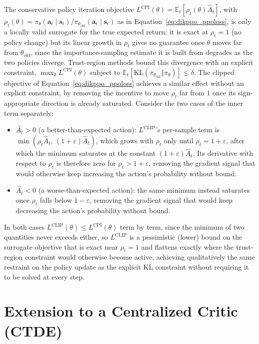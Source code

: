 The conservative policy iteration objective $L^{\text{CPI}}(\theta) = \mathbb{E}_t[\rho_t(\theta)\hat
A_t]$, with $\rho_t(\theta) = \pi_\theta(\mathbf{a}_t\mid\mathbf{s}_t)/\pi_{\theta_{\text{old}}}
(\mathbf{a}_t\mid\mathbf{s}_t)$ as in Equation~\eqref{eq:dikppo_ppoloss}, is only a locally valid
surrogate for the true expected return: it is exact at $\rho_t=1$ (no policy change) but its linear
growth in $\rho_t$ gives no guarantee once $\theta$ moves far from $\theta_{\text{old}}$, since the
importance-sampling estimate it is built from degrades as the two policies diverge. Trust-region
methods bound this divergence with an explicit constraint, $\max_\theta L^{\text{CPI}}(\theta)$
subject to $\mathbb{E}_t[\text{KL}(\pi_{\theta_{\text{old}}}\Vert\pi_\theta)] \leq \delta$. The
clipped objective of Equation~\eqref{eq:dikppo_ppoloss} achieves a similar effect without an explicit
constraint, by removing the incentive to move $\rho_t$ far from $1$ once its sign-appropriate
direction is already saturated. Consider the two cases of the inner term separately:
\begin{itemize}
    \item $\hat A_t > 0$ (a better-than-expected action): $L^{\text{CLIP}}$'s per-sample term is
    $\min\left(\rho_t\hat A_t,\, (1+\varepsilon)\hat A_t\right)$, which grows with $\rho_t$ only until
    $\rho_t = 1+\varepsilon$, after which the minimum saturates at the constant
    $(1+\varepsilon)\hat A_t$. Its derivative with respect to $\rho_t$ is therefore zero for $\rho_t >
    1+\varepsilon$, removing the gradient signal that would otherwise keep increasing the action's
    probability without bound.
    \item $\hat A_t < 0$ (a worse-than-expected action): the same minimum instead saturates once
    $\rho_t$ falls below $1-\varepsilon$, removing the gradient signal that would keep decreasing the
    action's probability without bound.
\end{itemize}
In both cases $L^{\text{CLIP}}(\theta) \leq L^{\text{CPI}}(\theta)$ term by term, since the minimum of
two quantities never exceeds either, so $L^{\text{CLIP}}$ is a pessimistic (lower) bound on the
surrogate objective that is exact near $\rho_t = 1$ and flattens exactly where the trust-region
constraint would otherwise become active, achieving qualitatively the same restraint on the policy
update as the explicit KL constraint without requiring it to be solved at every step.

\section{Extension to a Centralized Critic (CTDE)}\label{sec:appE_ctde}

